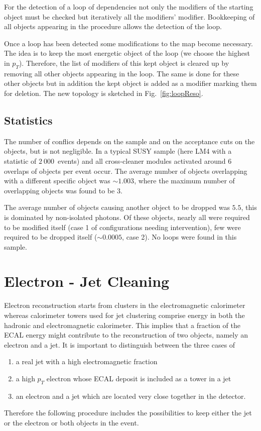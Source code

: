 \documentclass{cmspaper}
\begin{document}
For the detection of a loop of dependencies not only the modifiers of the
starting object must be checked but iteratively all the modifiers' modifier.
Bookkeeping of all objects appearing in the procedure allows the detection of
the loop.

Once a loop has been detected some modifications to the map become necessary.
The idea is to keep the most energetic object of the loop (we choose the
highest in $p_T$). Therefore, the list of modifiers of this kept object is
cleared up by removing all other objects appearing in the loop.  The same is
done for these other objects but in addition the kept object is added as a
modifier marking them for deletion. The new topology is sketched in
Fig.~\ref{fig:loopReso}.

\subsection{Statistics}
The number of conflics depends on the sample and on the acceptance cuts on the
objects, but is not negligible. In a typical SUSY sample (here LM4 with a
statistic of $2\ 000$~events) and all cross-cleaner modules activated around
\(6\) overlaps of objects per event occur. The average number of objects
overlapping with a different specific object was \( \sim 1.003\), where the
maximum number of overlapping objects was found to be \(3\). 

The average number of objects causing another object to be dropped was \(5.5\),
this is dominated by non-isolated photons.
Of these objects, nearly all were required to be modified itself (case 1 of
configurations needing intervention), few were required to be dropped itself (\(\sim
0.0005\), case 2). No loops were found in this sample.


\section{Electron - Jet Cleaning}
\label{sec:ElecJet}
Electron reconstruction starts from clusters in the electromagnetic calorimeter
whereas calorimeter towers used for jet clustering comprise energy in both the
hadronic and electromagnetic calorimeter. This implies that a fraction of the
ECAL energy might contribute to the reconstruction of two objects, namely an
electron and a jet. It is important to distinguish between the three cases of
\begin{enumerate}
\item a real jet with a high electromagnetic fraction
\item a high $p_T$ electron whose ECAL deposit is included as a tower in a jet
\item an electron and a jet which are located very close together in the
    detector.
\end{enumerate}
Therefore the following procedure includes the possibilities to keep either the
jet or the electron or both objects in the event.
\end{document}
